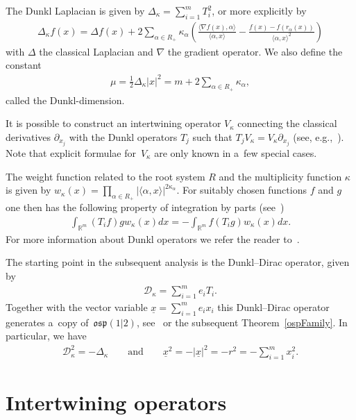 \documentclass[11pt]{article}
\numberwithin{equation}{section}
\numberwithin{theorem}{section}
\numberwithin{proposition}{section}
\numberwithin{lemma}{section}
\numberwithin{corollary}{section}
\numberwithin{definition}{section}
\numberwithin{example}{section}
\numberwithin{remark}{section}
\numberwithin{note}{section}
\theoremstyle{remark}
\newcommand{\mR}{\mathbb{R}}
\newcommand{\cD}{\mathcal{D}}
\newcommand{\ux}{\underline{x}}
\def\k{{\kappa}}
\begin{document}
The Dunkl Laplacian is given by $\Delta_{\k}=\sum\limits_{i=1}^{m}T_i^2$, or more explicitly by
\begin{gather*}
\Delta_{\k}f(x)=\Delta f(x)+2\sum_{\alpha\in R_{+}}\k_{\alpha}\left(\frac{\langle\nabla
f(x),\alpha\rangle}{\langle\alpha,x\rangle}-\frac{f(x)-f(r_{\alpha}(x))}{\langle\alpha,
x\rangle^{2}}\right)
\end{gather*}
with $\Delta$ the classical Laplacian and $\nabla$ the gradient operator.
We also def\/ine the constant
\begin{gather*}
\mu=\frac{1}{2}\Delta_{\k}|x|^2=m+2\sum_{\alpha\in R_+}\k_{\alpha},
\end{gather*}
called the Dunkl-dimension.

It is possible to construct an intertwining operator $V_{\k}$ connecting the classical derivatives
$\partial_{x_{j}}$ with the Dunkl operators $T_{j}$ such that $T_{j}V_{\k}=V_{\k}
\partial_{x_{j}}$ (see, e.g.,~\cite{MR1273532}).
Note that explicit formulae for~$V_{\k}$ are only known in a~few special cases.

The weight function related to the root system $R$ and the multiplicity function $\k$ is given by
$w_{\k}(x)=\prod\limits_{\alpha\in R_{+}}|\langle\alpha,x\rangle|^{2\k_{\alpha}}$.
For suitably chosen functions $f$ and $g$ one then has the following property of integration by
parts (see~\cite{Du4})
\begin{gather}
\int_{\mR^{m}}(T_{i}f)g w_{\k}(x)dx=-\int_{\mR^{m}}f\left(T_{i}g\right)w_{\k}(x)dx.
\label{skewnessDunkl}
\end{gather}
For more information about Dunkl operators we refer the reader to~\cite{MR1827871, MR2022853}.

The starting point in the subsequent analysis is the Dunkl--Dirac operator, given by
\begin{gather*}
\cD_{\k}=\sum_{i=1}^{m}e_{i}T_{i}.
\end{gather*}
Together with the vector variable $\ux=\sum\limits_{i=1}^{m}e_{i}x_{i}$ this Dunkl--Dirac operator
generates a~copy of~$\mathfrak{osp}(1|2)$, see~\cite{Orsted} or the subsequent Theorem~\ref{ospFamily}.
In particular, we have
\begin{gather*}
\cD_{\k}^{2}=-\Delta_{\k}\qquad\text{and}\qquad\ux^{2}=-|\ux|^{2}=-r^{2}=-
\sum_{i=1}^{m}x_{i}^{2}.
\end{gather*}

\section{Intertwining operators}\label{section3}
\end{document}

